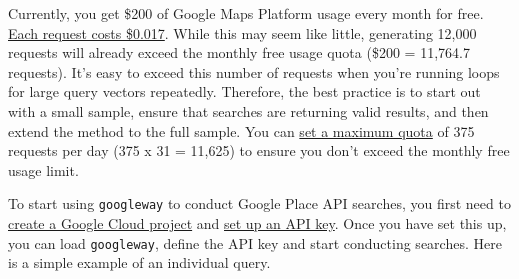 \documentclass[
]{book}
\begin{document}
Currently, you get \$200 of Google Maps Platform usage every month for free. \href{https://mapsplatform.google.com/pricing/}{Each request costs \$0.017}. While this may seem like little, generating 12,000 requests will already exceed the monthly free usage quota (\$200 = 11,764.7 requests). It's easy to exceed this number of requests when you're running loops for large query vectors repeatedly. Therefore, the best practice is to start out with a small sample, ensure that searches are returning valid results, and then extend the method to the full sample. You can \href{https://developers.google.com/maps/documentation/places/web-service/report-monitor\#quotas}{set a maximum quota} of 375 requests per day (375 x 31 = 11,625) to ensure you don't exceed the monthly free usage limit.

To start using \texttt{googleway} to conduct Google Place API searches, you first need to \href{https://developers.google.com/maps/documentation/places/web-service/cloud-setup}{create a Google Cloud project} and \href{https://developers.google.com/maps/documentation/places/web-service/get-api-key}{set up an API key}. Once you have set this up, you can load \texttt{googleway}, define the API key and start conducting searches.
Here is a simple example of an individual query.
\end{document}
